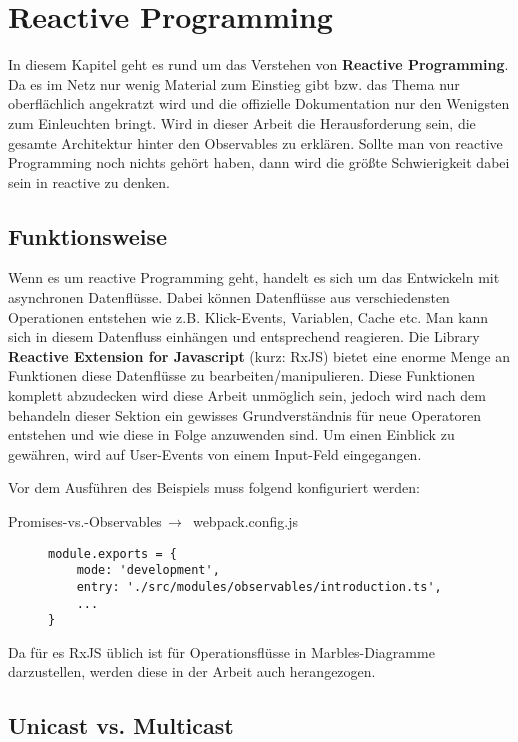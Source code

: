 \section{Reactive Programming}
In diesem Kapitel geht es rund um das Verstehen von \textbf{Reactive Programming}. Da es im Netz nur wenig Material zum Einstieg gibt bzw. das Thema nur oberflächlich angekratzt wird und die offizielle Dokumentation nur den Wenigsten zum Einleuchten bringt. Wird in dieser Arbeit die Herausforderung sein, die gesamte Architektur hinter den Observables zu erklären.
Sollte man von reactive Programming noch nichts gehört haben, dann wird die größte Schwierigkeit dabei sein in \glqq{}reactive\grqq{} zu denken.

\subsection{Funktionsweise}
Wenn es um reactive Programming geht, handelt es sich um das Entwickeln mit asynchronen Datenflüsse. Dabei können Datenflüsse aus verschiedensten Operationen entstehen wie z.B. Klick-Events, Variablen, Cache etc. Man kann sich in diesem Datenfluss einhängen und entsprechend reagieren. Die Library \textbf{Reactive Extension for Javascript} (kurz: RxJS) bietet eine enorme Menge an Funktionen diese Datenflüsse zu bearbeiten/manipulieren. Diese Funktionen komplett abzudecken wird diese Arbeit unmöglich sein, jedoch wird nach dem behandeln dieser Sektion ein gewisses Grundverständnis für neue Operatoren entstehen und wie diese in Folge anzuwenden sind. Um einen Einblick zu gewähren, wird auf User-Events von einem Input-Feld eingegangen.

\noindent
Vor dem Ausführen des Beispiels muss folgend konfiguriert werden:

 \begin{center}
     Promises-vs.-Observables$\,\to\,$ webpack.config.js
 \end{center}

\begin{figure}[H]
\begin{lstlisting}
module.exports = {
    mode: 'development',
    entry: './src/modules/observables/introduction.ts',
    ...
}
\end{lstlisting}
\end{figure}

Da für es RxJS üblich ist für Operationsflüsse in Marbles-Diagramme darzustellen, werden diese in der Arbeit auch herangezogen.

\subsection{Unicast vs. Multicast}
